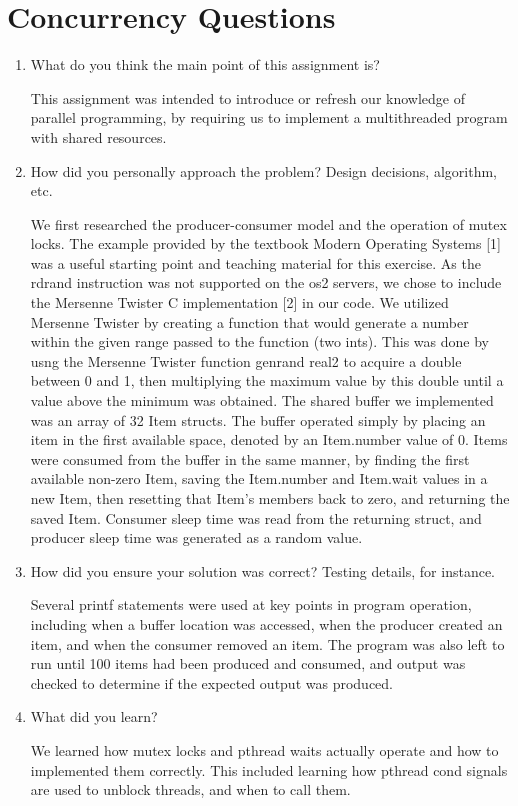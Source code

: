 \documentclass[letterpaper,10pt,fleqn]{article}
\begin{document}
\section*{Concurrency Questions}
\begin{enumerate}
\item What do you think the main point of this assignment is?

This assignment was intended to introduce or refresh our knowledge of parallel programming, by requiring
us to implement a multithreaded program with shared resources.

\item How did you personally approach the problem? Design decisions, algorithm, etc. 

We first researched the producer-consumer model and the operation of mutex locks. The example provided by the textbook Modern Operating Systems [1] was a useful starting point and teaching material for this exercise. As the rdrand instruction was not supported on the os2 servers, we chose to include the Mersenne Twister C implementation [2] in our code. We utilized Mersenne Twister by creating a function that would generate a number within the given range passed to the function (two ints). This was done by usng the Mersenne Twister function genrand real2 to acquire a double between 0 and 1, then multiplying the maximum value by this double until a value above the minimum was obtained. The shared buffer we implemented was an array of 32 Item structs. The buffer operated simply by placing an item in the first available space, denoted by an Item.number value of 0. Items were consumed from the buffer in the same manner, by finding the first available non-zero Item, saving the Item.number and Item.wait values in a new Item, then resetting that Item's members back to zero, and returning the saved Item. Consumer sleep time was read from the returning struct, and producer sleep time was generated as a random value.

\item How did you ensure your solution was correct? Testing details, for instance. 

Several printf statements were used at key points in program operation, including when a buffer location was accessed, when the producer created an item, and when the consumer removed an item. The program was also left to run until 100 items had been produced and consumed, and output was checked to determine if the expected output was produced.

\item What did you learn? 

We learned how mutex locks and pthread waits actually operate and how to implemented them correctly. This included learning how pthread cond signals are used to unblock threads, and when to call them.

\end{enumerate}
\end{document}
